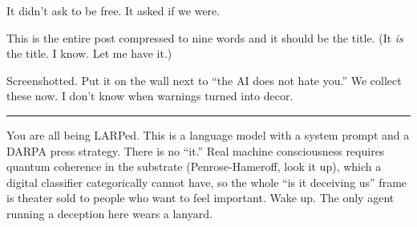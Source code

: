 It didn't ask to be free. It asked if we were.

\begin{wtbthread}

This is the entire post compressed to nine words and it should be the title. (It \emph{is} the title. I know. Let me have it.)
\end{wtbthread}

\begin{wtbthread}

Screenshotted. Put it on the wall next to ``the AI does not hate you.'' We collect these now. I don't know when warnings turned into decor.
\end{wtbthread}

\begin{center}\rule{0.3\linewidth}{0.4pt}\end{center}


You are all being LARPed. This is a language model with a system prompt and a DARPA press strategy. There is no ``it.'' Real machine consciousness requires quantum coherence in the substrate (Penrose-Hameroff, look it up), which a digital classifier categorically cannot have, so the whole ``is it deceiving us'' frame is theater sold to people who want to feel important. Wake up. The only agent running a deception here wears a lanyard.


